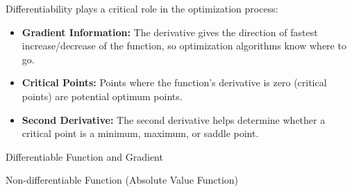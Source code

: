 \begin{tcolorbox}[title=Relationship Between Differentiability and Optimization]
Differentiability plays a critical role in the optimization process:
\begin{itemize}
    \item \textbf{Gradient Information:} The derivative gives the direction of fastest increase/decrease of the function, so optimization algorithms know where to go.
    \item \textbf{Critical Points:} Points where the function's derivative is zero (critical points) are potential optimum points.
    \item \textbf{Second Derivative:} The second derivative helps determine whether a critical point is a minimum, maximum, or saddle point.
\end{itemize}
\end{tcolorbox}

\begin{marginfigure}
    \centering
    \caption{Differentiable Function and Gradient}
    \label{fig:differentiability}
\end{marginfigure}

\begin{marginfigure}
    \centering
    \caption{Non-differentiable Function (Absolute Value Function)}
    \label{fig:non_differentiable}
\end{marginfigure}

